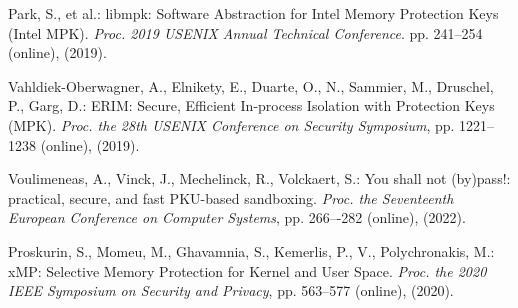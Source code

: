 \documentclass[english,preprint,JIP]{ipsj}
\begin{document}
\begin{thebibliography}{99}
    Park, S., et al.: libmpk: Software Abstraction for Intel Memory Protection Keys (Intel MPK).
    \textit{Proc. 2019 USENIX Annual Technical Conference}. pp. 241--254 (online), (2019).    
    

  Vahldiek-Oberwagner, A., Elnikety, E., Duarte, O., N., Sammier, M., Druschel, P., Garg, D.: ERIM: Secure, Efficient In-process Isolation with Protection Keys (MPK). \textit{Proc. the 28th USENIX Conference on Security Symposium}, pp. 1221--1238 (online),  (2019). 

Voulimeneas, A., Vinck, J., Mechelinck, R., Volckaert, S.: You shall not (by)pass!: practical, secure, and fast PKU-based sandboxing.
\textit{Proc. the Seventeenth European Conference on Computer Systems}, pp. 266–-282 (online),  (2022).


  Proskurin, S., Momeu, M., Ghavamnia, S., Kemerlis, P., V., Polychronakis, M.: xMP: Selective Memory Protection for Kernel and User Space.
  \textit{Proc. the 2020 IEEE Symposium on Security and Privacy}, pp. 563--577 (online),   (2020).


\end{thebibliography}
\end{document}
